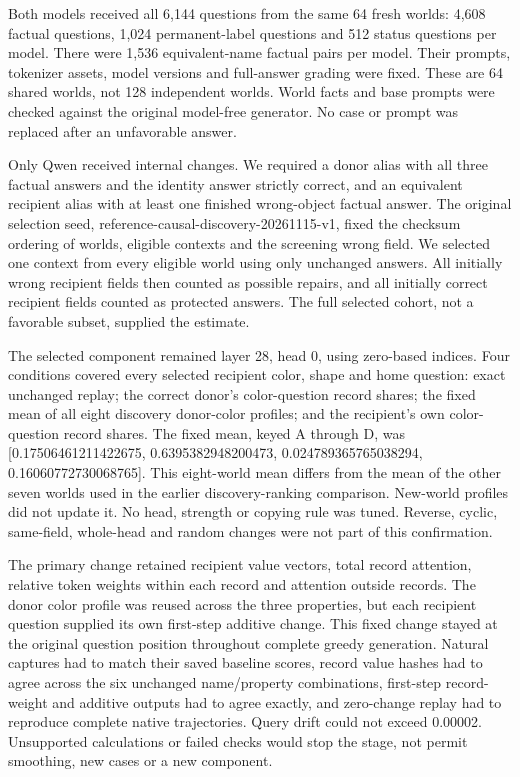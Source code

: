 \documentclass[10pt,letterpaper]{article}
\begin{document}
Both models received all 6,144 questions from the same 64 fresh worlds: 4,608 factual questions, 1,024 permanent-label questions and 512 status questions per model. There were 1,536 equivalent-name factual pairs per model. Their prompts, tokenizer assets, model versions and full-answer grading were fixed. These are 64 shared worlds, not 128 independent worlds. World facts and base prompts were checked against the original model-free generator. No case or prompt was replaced after an unfavorable answer.


Only Qwen received internal changes. We required a donor alias with all three factual answers and the identity answer strictly correct, and an equivalent recipient alias with at least one finished wrong-object factual answer. The original selection seed, reference-causal-discovery-20261115-v1, fixed the checksum ordering of worlds, eligible contexts and the screening wrong field. We selected one context from every eligible world using only unchanged answers. All initially wrong recipient fields then counted as possible repairs, and all initially correct recipient fields counted as protected answers. The full selected cohort, not a favorable subset, supplied the estimate.


The selected component remained layer 28, head 0, using zero-based indices. Four conditions covered every selected recipient color, shape and home question: exact unchanged replay; the correct donor's color-question record shares; the fixed mean of all eight discovery donor-color profiles; and the recipient's own color-question record shares. The fixed mean, keyed A through D, was [0.17506461211422675, 0.6395382948200473, 0.024789365765038294, 0.16060772730068765]. This eight-world mean differs from the mean of the other seven worlds used in the earlier discovery-ranking comparison. New-world profiles did not update it. No head, strength or copying rule was tuned. Reverse, cyclic, same-field, whole-head and random changes were not part of this confirmation.


The primary change retained recipient value vectors, total record attention, relative token weights within each record and attention outside records. The donor color profile was reused across the three properties, but each recipient question supplied its own first-step additive change. This fixed change stayed at the original question position throughout complete greedy generation. Natural captures had to match their saved baseline scores, record value hashes had to agree across the six unchanged name/property combinations, first-step record-weight and additive outputs had to agree exactly, and zero-change replay had to reproduce complete native trajectories. Query drift could not exceed 0.00002. Unsupported calculations or failed checks would stop the stage, not permit smoothing, new cases or a new component.
\end{document}
